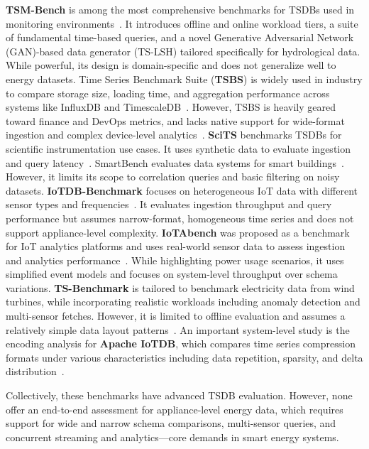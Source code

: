 \documentclass[conference]{IEEEtran}
\begin{document}
\textbf{TSM-Bench} is among the most comprehensive benchmarks for TSDBs used in monitoring environments~\cite{1_tsmbench2023}. It introduces offline and online workload tiers, a suite of fundamental time-based queries, and a novel Generative Adversarial Network (GAN)-based data generator (TS-LSH) tailored specifically for hydrological data. While powerful, its design is domain-specific and does not generalize well to energy datasets. Time Series Benchmark Suite (\textbf{TSBS}) is widely used in industry to compare storage size, loading time, and aggregation performance across systems like InfluxDB and TimescaleDB~\cite{3_tsbs}. However, TSBS is heavily geared toward finance and DevOps metrics, and lacks native support for wide-format ingestion and complex device-level analytics~\cite{3_tsbs}.
\textbf{SciTS} benchmarks TSDBs for scientific instrumentation use cases. It uses synthetic data to evaluate ingestion and query latency~\cite{5_scits2022}. SmartBench evaluates data systems for smart buildings~\cite{4_smartbench2020}. However, it limits its scope to correlation queries and basic filtering on noisy datasets. 
\textbf{IoTDB-Benchmark} focuses on heterogeneous IoT data with different sensor types and frequencies~\cite{7_iotdbbenchmark}. It evaluates ingestion throughput and query performance but assumes narrow-format, homogeneous time series and does not support appliance-level complexity.
\textbf{IoTAbench} was proposed as a benchmark for IoT analytics platforms and uses real-world sensor data to assess ingestion and analytics performance~\cite{9_iotabench2015}. While highlighting power usage scenarios, it uses simplified event models and focuses on system-level throughput over schema variations.
\textbf{TS-Benchmark} is tailored to benchmark electricity data from wind turbines, while incorporating realistic workloads including anomaly detection and multi-sensor fetches. However, it is limited to offline evaluation and assumes a relatively simple data layout patterns~\cite{10_tsbenchmark2021}.
An important system-level study is the encoding analysis for \textbf{Apache IoTDB}, which compares time series compression formats under various characteristics including data repetition, sparsity, and delta distribution~\cite{11_iotdbencoding2022}.

Collectively, these benchmarks have advanced TSDB evaluation. However, none offer an end-to-end assessment for appliance-level energy data, which requires support for wide and narrow schema comparisons, multi-sensor queries, and concurrent streaming and analytics—core demands in smart energy systems.
\end{document}
